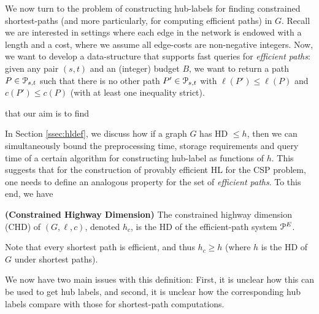 
We now turn to the problem of constructing hub-labels for finding constrained shortest-paths (and more particularly, for computing efficient paths) in $G$. 
Recall we are interested in settings where each edge in the network is endowed with a length and a cost, where we assume all edge-costs are non-negative integers.
Now, we want to develop a data-structure that supports fast queries for \emph{efficient paths}: given any pair $(s,t)$ and an (integer) budget $B$, we want to return a path $P\in \mathcal{P}_{s,t}$ such that there is no other path $P'\in \mathcal{P}_{s,t}$ with $\ell(P')\leq \ell(P)$ and $c(P')\leq c(P)$ (with at least one inequality strict). 

that our aim is to find 

In Section \ref{ssec:hldef}, we discuss how if a graph $G$ has HD $\leq h$, then we can simultaneously bound the preprocessing time, storage requirements and query time of a certain algorithm for constructing hub-label as functions of $h$.
This suggests that for the construction of provably efficient HL for the CSP problem, one needs to define an analogous property for the set of \emph{efficient paths}.
To this end, we have
\begin{definition}
\textbf{(Constrained Highway Dimension)} The constrained highway dimension (CHD) of $(G,\ell,c)$, denoted $h_c$, is the HD of the efficient-path system $\mathcal{P}^E$.
\end{definition}
Note that every shortest path is efficient, and thus $h_c\geq h$ (where $h$ is the HD of $G$ under shortest paths).


We now have two main issues with this definition: First, it is unclear how this can be used to get hub labels, and second, it is unclear how the corresponding hub labels compare with those for shortest-path computations. 




